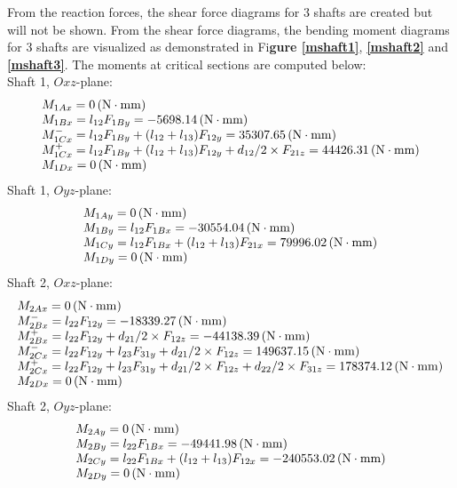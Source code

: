 From the reaction forces, the shear force diagrams for 3 shafts are created but will not be shown. From the shear force diagrams, the bending moment diagrams for 3 shafts are visualized as demonstrated in Fi\textbf{gure \ref{mshaft1}}, \textbf{\ref{mshaft2}} and \textbf{\ref{mshaft3}}. The moments at critical sections are computed below:\\
Shaft 1, $ Oxz $-plane:
\[
\begin{array}{l}
M_{1Ax} = 0 \, (\mathrm{N\cdot mm})\\
M_{1Bx} = l_{12}F_{1By} = -5698.14 \, (\mathrm{N\cdot mm})\\
M_{1Cx}^- = l_{12}F_{1By}+(l_{12}+l_{13})F_{12y} = 35307.65 \, (\mathrm{N\cdot mm})\\
M_{1Cx}^+ = l_{12}F_{1By}+(l_{12}+l_{13})F_{12y}+d_{12}/2\times F_{21z} = 44426.31 \, (\mathrm{N\cdot mm})\\
M_{1Dx} = 0 \, (\mathrm{N\cdot mm})\\
\end{array}
\]
Shaft 1, $ Oyz $-plane:
\[
\begin{array}{l}
M_{1Ay} = 0 \, (\mathrm{N\cdot mm})\\
M_{1By} = l_{12}F_{1Bx} = -30554.04 \, (\mathrm{N\cdot mm})\\
M_{1Cy} = l_{12}F_{1Bx}+(l_{12}+l_{13})F_{21x} = 79996.02 \, (\mathrm{N\cdot mm})\\
M_{1Dy} = 0 \, (\mathrm{N\cdot mm})
\end{array}
\]
Shaft 2, $ Oxz $-plane:
\[
\begin{array}{l}
M_{2Ax} = 0 \, (\mathrm{N\cdot mm})\\
M_{2Bx}^- = l_{22}F_{12y} =  -18339.27 \, (\mathrm{N\cdot mm})\\
M_{2Bx}^+ = l_{22}F_{12y} + d_{21}/2\times F_{12z} = -44138.39 \, (\mathrm{N\cdot mm})\\
M_{2Cx}^- = l_{22}F_{12y} + l_{23}F_{31y} + d_{21}/2\times F_{12z} = 149637.15 \, (\mathrm{N\cdot mm})\\
M_{2Cx}^+ = l_{22}F_{12y} + l_{23}F_{31y} + d_{21}/2\times F_{12z} + d_{22}/2\times F_{31z} = 178374.12 \, (\mathrm{N\cdot mm})\\
M_{2Dx} = 0 \, (\mathrm{N\cdot mm})\\
\end{array}
\]
Shaft 2, $ Oyz $-plane:
\[
\begin{array}{l}
M_{2Ay} = 0 \, (\mathrm{N\cdot mm})\\
M_{2By} = l_{22}F_{1Bx} = -49441.98 \, (\mathrm{N\cdot mm})\\
M_{2Cy} = l_{22}F_{1Bx}+(l_{12}+l_{13})F_{12x} = -240553.02 \, (\mathrm{N\cdot mm})\\
M_{2Dy} = 0 \, (\mathrm{N\cdot mm})
\end{array}
\]
